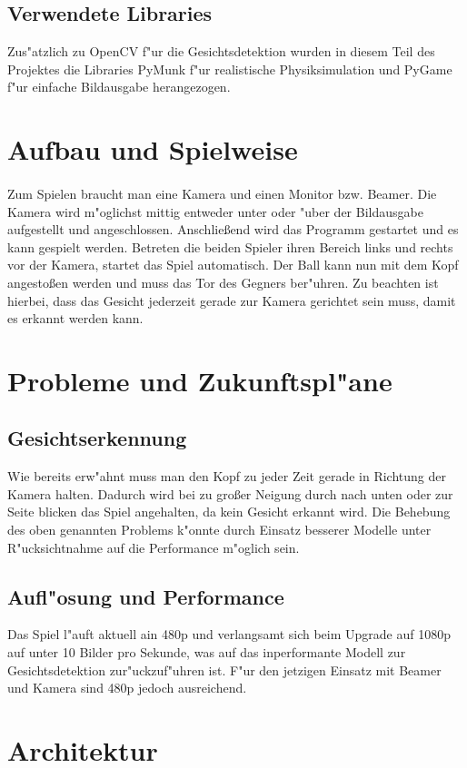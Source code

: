 \documentclass[12pt]{article}
\begin{document}
\subsection{Verwendete Libraries}
Zus"atzlich zu OpenCV f"ur die Gesichtsdetektion wurden in diesem Teil des Projektes
die Libraries PyMunk f"ur realistische Physiksimulation und PyGame f"ur einfache Bildausgabe
herangezogen.
\section{Aufbau und Spielweise}
\paragraph{}
Zum Spielen braucht man eine Kamera und einen Monitor bzw. Beamer. Die Kamera
wird m"oglichst mittig entweder unter oder "uber der Bildausgabe aufgestellt und angeschlossen.
Anschlie{\ss}end wird das Programm gestartet und es kann gespielt werden.
Betreten die beiden Spieler ihren Bereich links und rechts vor der Kamera,
startet das Spiel automatisch. Der Ball kann nun mit dem Kopf angesto{\ss}en werden
und muss das Tor des Gegners ber"uhren. Zu beachten ist hierbei, dass
das Gesicht jederzeit gerade zur Kamera gerichtet sein muss, damit es erkannt werden kann.
\section{Probleme und Zukunftspl"ane}
\subsection{Gesichtserkennung}
Wie bereits erw"ahnt muss man den Kopf zu jeder Zeit gerade in Richtung
der Kamera halten. Dadurch wird bei zu gro{\ss}er Neigung durch nach unten oder zur
Seite blicken das Spiel angehalten, da kein Gesicht erkannt wird.
Die Behebung des oben genannten Problems k"onnte durch Einsatz besserer
Modelle unter R"ucksichtnahme auf die Performance m"oglich sein.
\subsection{Aufl"osung und Performance}
Das Spiel l"auft aktuell ain 480p und verlangsamt sich beim Upgrade auf 1080p
auf unter 10 Bilder pro Sekunde, was auf das inperformante Modell zur
Gesichtsdetektion zur"uckzuf"uhren ist. F"ur den jetzigen Einsatz mit
Beamer und Kamera sind 480p jedoch ausreichend.
\section{Architektur}
\end{document}
